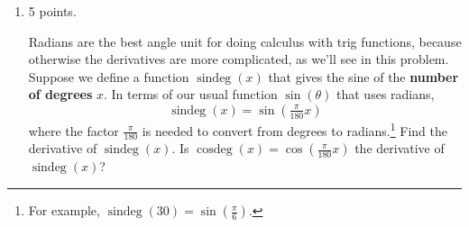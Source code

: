 \documentclass{article}
\begin{document}
\begin{enumerate}
\begin{enumerate}
\begin{solution}
This means than for $x$ very small, i.e. very close to 0, $\dfrac{\sin x}{x}
\approx 1$. That is, $\sin x \approx x$. Notice that this \textbf{is} the linear
approximation of $\sin x$ at $x=0$. 
\end{solution}



\item
\begin{problem}[\nstretch{2}]
Find the equation of the tangent line to $\cos x$ at $x=0$.
(You can find this by observation without doing any calculus.) What does the limit $\displaystyle\lim_{x\to0}\frac{\cos x-1}{x}=0$ have to do with the tangent line?
\end{problem}

\begin{solution}
We can see that the tangent line to $y=\cos x$ at $x=0$ is horizontal.
Thus, the equation of the tangent line is $y=1$. 

$\lim\limits_{x\to0}\dfrac{\cos x -1}{x}$ is the definition of the derivative of $\cos x$ at $x=0$, so the slope of the tangent line at $x=0$ is $0$. 

Also, for small $x$, $\dfrac{\cos x -1}{x}
\approx0$ implies $\cos x - 1 \approx 0$, or $\cos x \approx 1$.  
\end{solution}

\end{enumerate}

\item 

\begin{grading}
5 points.
\end{grading}

  \begin{problem}[\vfill]
    Radians are the best angle unit for doing
    calculus with trig functions, because otherwise the derivatives are more complicated, as we'll see in this problem. Suppose we define a
    function $\operatorname{sindeg}(x)$ that gives the sine of the \textbf{number of degrees} $x$. In terms of our usual function $\sin(\theta)$ that uses radians,
    \[\operatorname{sindeg}(x) =  \sin (\tfrac{\pi
        }{180}x)\] where the factor $\frac{\pi}{180}$ is needed to convert from degrees to radians.\footnote{For example, $\operatorname{sindeg}(30) = \sin
      (\frac{\pi}{6})$.}  Find the derivative of $\operatorname{sindeg}(x)$.
    Is $\operatorname{cosdeg}(x)=\cos(\frac{\pi}{180}x)$ the derivative of $\operatorname{sindeg}(x)$?
  \end{problem}


\end{enumerate}
\end{document}
